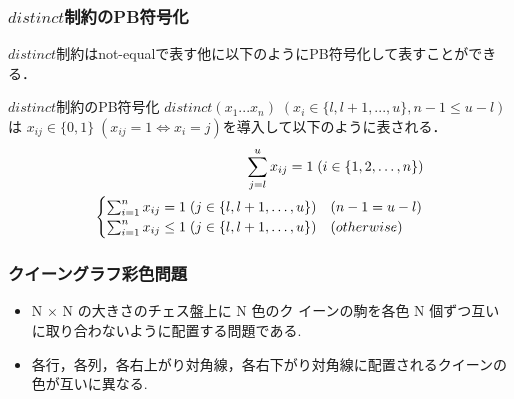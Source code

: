 \documentclass [dvipdfmx,12pt]{beamer}
\newcommand{\distinct}{$distinct$}
\begin{document}
\begin{frame}
    \frametitle{\distinct 制約のPB符号化}
    \distinct 制約はnot-equalで表す他に以下のようにPB符号化して表すことができる．
    \begin{block}{ \distinct 制約のPB符号化}
        $distinct(x_1 ... x_n) \; (x_i \in \{l, l+1, ..., u\}, n-1 \leq u-l)$は
        $x_{ij} \in \{0,1\} \; (x_{ij}=1 \Leftrightarrow x_i=j)$を導入して以下のように表される．
        \begin{eqnarray}
            \sum_{j=l}^{u} x_{ij}=1 \; (i \in \{1,2,\ldots,n\}) \label{eq:pb_1}\\
            \vspace{-3mm}
            \begin{cases}
                \sum_{i=1}^{n} x_{ij} = 1 \; (j \in \{l,l+1,\ldots,u\}) & (n-1=u-l) \\
                \sum_{i=1}^{n} x_{ij} \leq 1 \; (j \in \{l,l+1,\ldots,u\}) & (otherwise)
            \end{cases}\label{eq:pb_2}
        \end{eqnarray}
    \end{block}
\end{frame}


\begin{frame}
    \frametitle{クイーングラフ彩色問題}
    
    \begin{itemize}
        \item N × N の大きさのチェス盤上に N 色のク イーンの駒を各色 N 個ずつ互いに取り合わないように配置する問題である.
        \item \alert{各行}，\alert{各列}，\alert{各右上がり対角線}，\alert{各右下がり対角線}に配置されるクイーンの色が互いに異なる.
    \end{itemize}
\end{frame}
\end{document}
